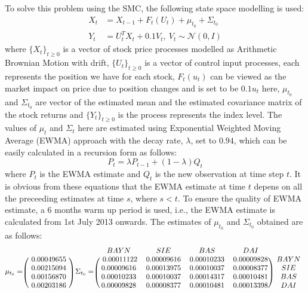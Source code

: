 To solve this problem using the SMC,  the following state space modelling is used:
\begin{align}
  X_t &= X_{t-1} + F_t(U_t) + \mu_{t_0} + \Sigma_{t_0} \\
  Y_t &= U^T_tX_t + 0.1V_t,~V_t \sim \mathcal{N}(0, I)
\end{align}
where $\{X_t\}_{t \geq 0}$ is a vector of stock price processes modelled as Arithmetic Brownian Motion with drift, $\{U_t\}_{t \geq 0}$ is a vector of control input processes, each represents the position we have for each stock, $F_t(u_t)$ can be viewed as the market impact on price due to position changes and is set to be $0.1u_t$ here, $\mu_{t_0}$ and $\Sigma_{t_0}$ are vector of the estimated mean and the estimated covariance matrix of the stock returns and $\{Y_t\}_{t \geq 0}$ is the process represents the index level. The values of $\mu_t$ and $\Sigma_t$ here are estimated using Exponential Weighted Moving Average (EWMA) approach with the decay rate, $\lambda$, set to $0.94$, which can be easily calculated in a recursion form as follows:
\begin{equation}
  P_t = \lambda P_{t-1} + (1-\lambda) Q_{t}
\end{equation}
where $P_t$ is the EWMA estimate and $Q_t$ is the new observation at time step $t$. It is obvious from these equations that the EWMA estimate at time $t$ depens on all the preceeding estimates at time $s$, where $s < t$. To ensure the quality of EWMA estimate, a 6 months warm up period is used, i.e., the EWMA estimate is calculated from 1st July 2013 onwards. The estimates of $\mu_{t_0}$ and $\Sigma_{t_0}$ obtained are as follows:
\begin{equation}
\mu_{t_0} =
\begin{blockarray}{c}
\\
\begin{block}{(c)}
~ 0.00049655 ~ \\
0.00215094 \\
0.00156870 \\
0.00203186 \\
\end{block}
\end{blockarray}
~\Sigma_{t_0} =
\begin{blockarray}{ccccc}
  BAYN & SIE & BAS & DAI & \\
\begin{block}{(cccc)c}
 ~ 0.00011122 & 0.00009616 & 0.00010233 & 0.00009828 ~ & BAYN \\
0.00009616 & 0.00013975 & 0.00010037 & 0.00008377 ~ & SIE \\
0.00010233 & 0.00010037 & 0.00014317 & 0.00010481 & BAS \\
0.00009828 & 0.00008377 & 0.00010481 & 0.00013398 & DAI \\
\end{block}
\end{blockarray}
\end{equation}
 
